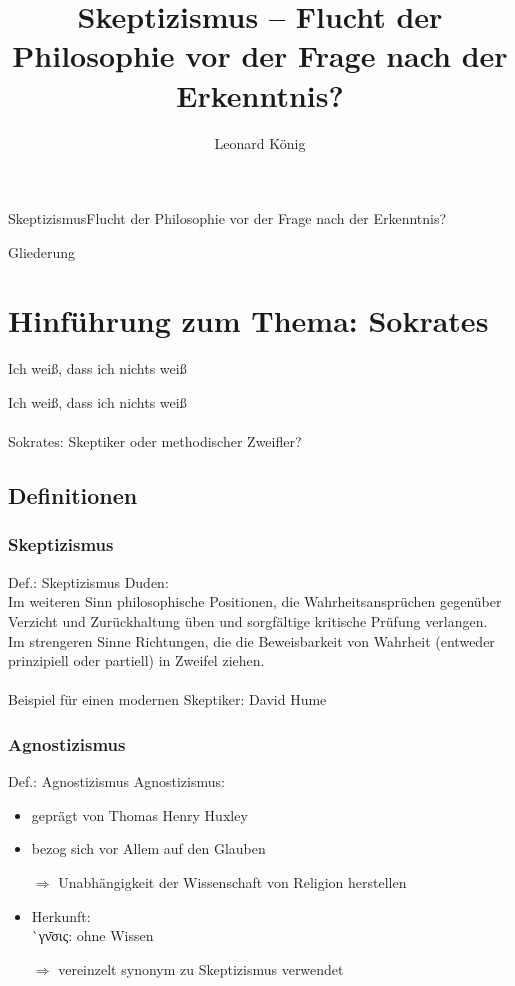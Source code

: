 \documentclass[12pt]{beamer}
\author{Leonard König}
\title[Skeptizismus]{Skeptizismus – Flucht der Philosophie vor der Frage nach der Erkenntnis?}
\institute{Herder-Gymnasium}
\begin{document}
\begin{frame}{Skeptizismus}{Flucht der Philosophie vor der Frage nach der Erkenntnis?}
\titlepage
\end{frame}

\begin{frame}{Gliederung}
\tableofcontents
\end{frame}


\section{Hinführung zum Thema: Sokrates}
\begin{frame}{\glqq Ich weiß, dass ich nichts weiß\grqq}
\begin{center}
\glqq Ich weiß, dass ich nichts weiß\grqq\\
\ \\
Sokrates: Skeptiker oder methodischer Zweifler?
\end{center}
\end{frame}

\subsection{Definitionen}
\subsubsection{Skeptizismus}
\begin{frame}{Def.: Skeptizismus}
Duden:\\
\glqq Im weiteren Sinn philosophische Positionen, die Wahrheitsansprüchen gegenüber Verzicht und Zurückhaltung üben und sorgfältige kritische Prüfung verlangen.\\
Im strengeren Sinne Richtungen, die die Beweisbarkeit von Wahrheit (entweder prinzipiell oder partiell) in Zweifel ziehen.\grqq\\
\ \\
Beispiel für einen modernen Skeptiker: David Hume
\end{frame}		

\subsubsection{Agnostizismus}
\begin{frame}{Def.: Agnostizismus}
Agnostizismus:
\begin{itemize}
\item geprägt von Thomas Henry Huxley
\item bezog sich vor Allem auf den Glauben
\item[$\Rightarrow$] Unabhängigkeit der Wissenschaft von Religion herstellen
\item Herkunft: \\
{\`{\textalpha}γν\={\textomega}σις}: \glqq ohne Wissen\grqq\
\item[$\Rightarrow$] vereinzelt synonym zu Skeptizismus verwendet
\end{itemize}
\end{frame}
\end{document}
